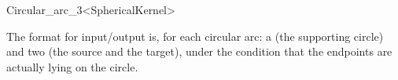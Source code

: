 \begin{ccRefClass}{Circular_arc_3<SphericalKernel>}

\ccGlue
{}

The format for input/output is, for each circular arc: a  
(the supporting circle) and two  
(the source and the target), under the condition that the endpoints 
are actually lying on the circle. 

\ccSeeAlso

\\

\end{ccRefClass}
